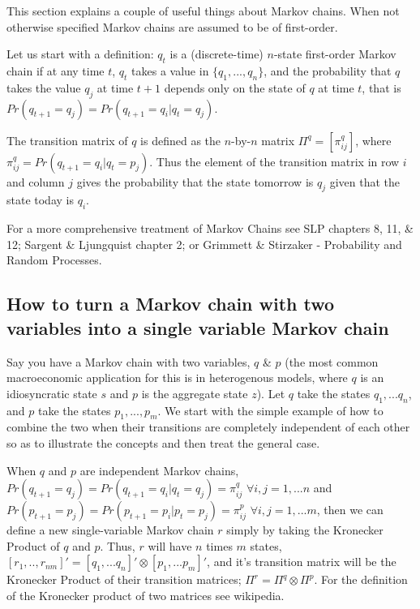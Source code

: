 This section explains a couple of useful things about Markov chains. When not otherwise specified Markov chains are assumed to be of first-order. 

Let us start with a definition: $q_t$ is a (discrete-time) $n$-state first-order Markov chain if at any time $t$, $q_t$ takes a value in $\{q_1,...,q_n\}$, and
the probability that $q$ takes the value $q_j$ at time $t+1$ depends only on the state of $q$ at time $t$, that is $Pr(q_{t+1}=q_j)=Pr(q_{t+1}=q_i | q_t=q_j)$.

The transition matrix of $q$ is defined as the $n$-by-$n$ matrix $\Pi^q=[\pi^q_{ij}]$, where $\pi^q_{ij}=Pr(q_{t+1}=q_i | q_t=p_j)$. Thus the element of the
transition matrix in row $i$ and column $j$ gives the probability that the state tomorrow is $q_j$ given that the state today is $q_i$.

For a more comprehensive treatment of Markov Chains see SLP chapters 8, 11, \& 12; Sargent \& Ljungquist chapter 2; or Grimmett \& Stirzaker - Probability
and Random Processes.

\subsection{How to turn a Markov chain with two variables into a single variable Markov chain}
Say you have a Markov chain with two variables, $q$ \& $p$ (the most common macroeconomic application for this is in heterogenous models, where $q$ is an 
idiosyncratic state $s$ and $p$ is the aggregate state $z$). Let $q$ take the states $q_1,...q_n$, and $p$ take the states $p_1,...,p_m$. We start with 
the simple example of how to combine the two when their transitions are completely independent of each other so as to illustrate the concepts and then 
treat the general case.

When $q$ and $p$ are independent Markov chains, $Pr(q_{t+1}=q_j)=Pr(q_{t+1}=q_i | q_t=q_j)=\pi^q_{ij}$ $\forall i,j=1,...n$ and 
$Pr(p_{t+1}=p_j)=Pr(p_{t+1}=p_i | p_t=p_j)=\pi^p_{ij}$ $\forall i,j=1,...m$, then we can define a new single-variable Markov chain $r$
simply by taking the Kronecker Product of $q$ and $p$. Thus, $r$ will have $n$ times $m$ states, $[r_1,..,r_{nm}]'=[q_1,...q_n]'\otimes[p_1,...p_m]'$, and it's transition matrix
will be the Kronecker Product of their transition matrices; $\Pi^r=\Pi^q \otimes \Pi^p$. For the definition of the Kronecker product of two matrices see
wikipedia.


